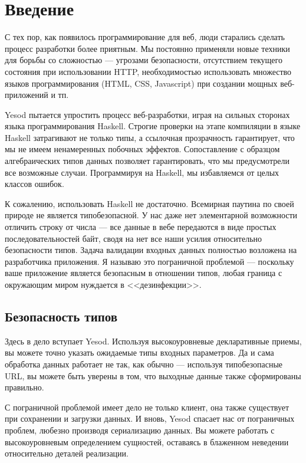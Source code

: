 \chapter{Введение}

С тех пор, как появилось программирование для веб, люди старались сделать процесс разработки более приятным. Мы постоянно применяли новые техники для борьбы со сложностью --- угрозами безопасности, отсутствием текущего состояния при использовании HTTP, необходимостью использовать множество языков программирования (HTML, CSS, Javascript) при создании мощных веб-приложений и тп.

Yesod пытается упростить процесс веб-разработки, играя на сильных сторонах языка программирования Haskell. Строгие проверки на этапе компиляции в языке Haskell затрагивают не только типы, а ссылочная прозрачность гарантирует, что мы не имеем ненамеренных побочных эффектов. Сопоставление с образцом алгебраических типов данных позволяет гарантировать, что мы предусмотрели все возможные случаи. Программируя на Haskell, мы избавляемся от целых классов ошибок.

К сожалению, использовать Haskell не достаточно. Всемирная паутина по своей природе не является типобезопасной. У нас даже нет элементарной возможности отличить строку от числа --- все данные в вебе передаются в виде простых последовательностей байт, сводя на нет все наши усилия относительно безопасности типов. Задача валидации входных данных полностью возложена на разработчика приложения. Я называю это пограничной проблемой --- поскольку ваше приложение является безопасным в отношении типов, любая граница с окружающим миром нуждается в <<дезинфекции>>.

\section{Безопасность типов}

Здесь в дело вступает Yesod. Используя высокоуровневые декларативные приемы, вы можете точно указать ожидаемые типы входных параметров. Да и сама обработка данных работает не так, как обычно --- используя типобезопасные URL, вы можете быть уверены в том, что выходные данные также сформированы правильно.

С пограничной проблемой имеет дело не только клиент, она также существует при сохранении и загрузки данных. И вновь, Yesod спасает нас от пограничных проблем, любезно производя сериализацию данных. Вы можете работать с высокоуровневым определением сущностей, оставаясь в блаженном неведении относительно деталей реализации.


